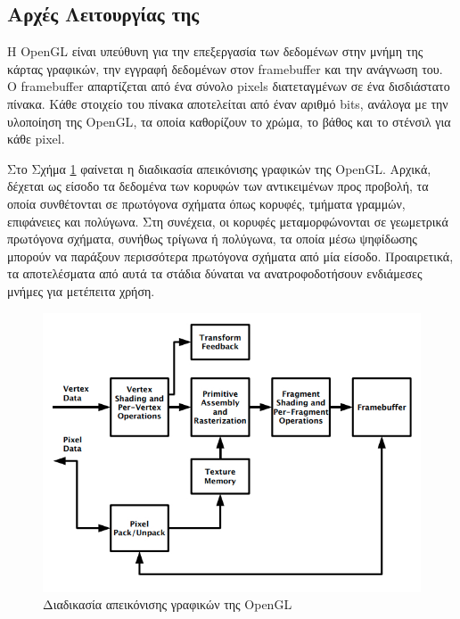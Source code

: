 \documentclass{report}
\newcommand{\engl}[1]{{\selectlanguage{english}{#1}}}
\begin{document}
\subsection{Αρχές Λειτουργίας της \texorpdfstring{\engl{OpenGL}}{OpenGL}}
Η {OpenGL} είναι υπεύθυνη για την επεξεργασία των δεδομένων στην μνήμη της κάρτας γραφικών, την εγγραφή δεδομένων στον {framebuffer} και την ανάγνωση του. Ο {framebuffer} απαρτίζεται από ένα σύνολο {pixels} διατεταγμένων σε ένα δισδιάστατο πίνακα. Κάθε στοιχείο του πίνακα αποτελείται από έναν αριθμό {bits}, ανάλογα με την υλοποίηση της {OpenGL}, τα οποία καθορίζουν το χρώμα, το βάθος και το στένσιλ για κάθε {pixel}.

Στο Σχήμα \ref{fig:opengl_pipeline} φαίνεται η διαδικασία απεικόνισης γραφικών της {OpenGL}. Αρχικά, δέχεται ως είσοδο τα δεδομένα των κορυφών των αντικειμένων προς προβολή, τα οποία συνθέτονται σε πρωτόγονα σχήματα όπως κορυφές, τμήματα γραμμών, επιφάνειες και πολύγωνα. Στη συνέχεια, οι κορυφές μεταμορφώνονται σε γεωμετρικά πρωτόγονα σχήματα, συνήθως τρίγωνα ή πολύγωνα, τα οποία μέσω ψηφίδωσης μπορούν να παράξουν περισσότερα πρωτόγονα σχήματα από μία είσοδο. Προαιρετικά, τα αποτελέσματα από αυτά τα στάδια δύναται να ανατροφοδοτήσουν ενδιάμεσες μνήμες για μετέπειτα χρήση.

\begin{figure}[t]
    \centering
    \includegraphics[scale=2.2]{images/opengl_pipeline.jpg}
    \caption{Διαδικασία απεικόνισης γραφικών της {OpenGL}}
    \label{fig:opengl_pipeline}
\end{figure}
\end{document}
